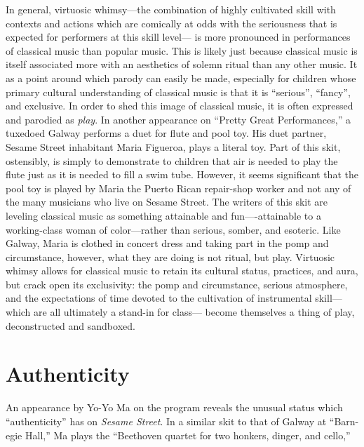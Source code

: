 \documentclass[12pt,letterpaper]{article}
\begin{document}
	In general, virtuosic whimsy---the combination of highly cultivated
	skill with contexts and actions which are comically at odds with the
	seriousness that is expected for performers at this skill level--- is 
	more pronounced in performances	of classical music than popular music.
	This is likely just because classical music is itself associated more
	with an aesthetics of solemn ritual than any other music. It as a point
	around which parody can easily be made, especially for children whose
	primary cultural understanding of classical music is that it is 
	``serious'', ``fancy'', and 
	exclusive. In order to shed this image of classical music, it is often 
	expressed and parodied as \textit{play}. In another appearance on 
	``Pretty Great Performances,'' a tuxedoed Galway performs a duet for 
	flute and pool toy.\autocite{Galway1} His duet partner, Sesame 
	Street inhabitant Maria Figueroa,\autocite{Maria} plays a literal toy. 
	Part of this skit, ostensibly, is simply to demonstrate to children that
	air is needed to play the flute just as it is needed to fill a swim 
	tube. However, it seems significant that the pool toy is played by Maria
	the Puerto Rican repair-shop worker and not any of the many musicians 
	who live on Sesame Street. The writers of this skit are leveling 
	classical music as something attainable and fun----attainable to a 
	working-class woman of color---rather than serious, somber, and 
	esoteric. Like Galway, Maria is clothed in concert dress and taking part
	in the pomp and circumstance, however, what they are doing is not 
	ritual, but play. Virtuosic whimsy allows for classical music to retain 
	its cultural status, practices, and aura, but crack open its 
	exclusivity: the pomp and circumstance, serious atmosphere, 
	and the expectations of time devoted to the cultivation of instrumental
	skill---which are all ultimately a stand-in for 
	class---\autocite[7]{Bull} become themselves a thing of play, 
	deconstructed and sandboxed. 

	\section*{Authenticity}

	An appearance by Yo-Yo Ma on the program reveals the unusual status 
	which ``authenticity'' has on \textit{Sesame Street}. In a similar 
	skit to that of Galway at ``Barn-egie Hall,'' Ma plays the 
	``Beethoven quartet for two honkers, dinger, and cello,'' 
\end{document}
